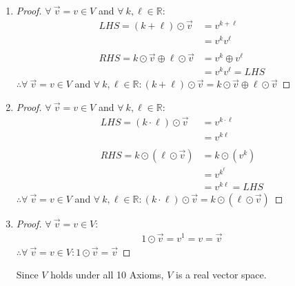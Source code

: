 \documentclass{article}
\newcommand{\bld}{\textbf}
\newcommand{\bb}{\mathbb}
\newcommand{\bitem}[1]{\item[\bld{#1.}]}
\begin{document}
\begin{enumerate}
\begin{proof}
  \end{proof}
  \bitem{Axiom 8}
  \begin{proof}
    $\forall~\vec{v} = v \in V$ and $\forall~k,\ell \in \bb{R}$:
    \begin{align*}
      LHS = (k + \ell) \odot \vec{v}                  & = v^{k+\ell}        \\
                                                      & = v^kv^\ell         \\ \\
      RHS = k \odot \vec{v} \oplus \ell \odot \vec{v} & = v^k \oplus v^\ell \\
                                                      & = v^kv^\ell = LHS
    \end{align*}
    $\therefore \forall~\vec{v} = v \in V$ and $\forall~k,\ell \in \bb{R}: (k + \ell) \odot \vec{v} = k \odot \vec{v} \oplus \ell \odot \vec{v}$
  \end{proof}
  \bitem{Axiom 9}
  \begin{proof}
    $\forall~\vec{v} = v \in V$ and $\forall~k,\ell \in \bb{R}$:
    \begin{align*}
      LHS = (k \cdot \ell) \odot \vec{v} & = v^{k \cdot \ell} \\
                                         & = v^{k\ell}        \\ \\
      RHS = k \odot (\ell \odot \vec{v}) & = k \odot (v^k)    \\
                                         & = v^{k^\ell}       \\
                                         & = v^{k\ell} = LHS
    \end{align*}
    $\therefore \forall~\vec{v} = v \in V$ and $\forall~k,\ell \in \bb{R}: (k \cdot \ell) \odot \vec{v} = k \odot (\ell \odot \vec{v})$
  \end{proof}
  \bitem{Axiom 10}
  \begin{proof}
    $\forall~\vec{v} = v \in V$:
    \begin{align*}
      1 \odot \vec{v} = v^1 = v = \vec{v}
    \end{align*}
    $\therefore \forall~\vec{v} = v \in V: 1 \odot \vec{v} = \vec{v}$
  \end{proof}
  Since $V$ holds under all 10 Axioms, $V$ is a real vector space.
\end{enumerate}
\end{document}

